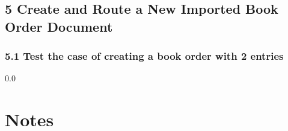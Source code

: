 \subsection*{5 Create and Route a New Imported Book Order Document}
\subsubsection*{5.1 Test the case of creating a book order with 2
  entries}

\newpage
  {\setlength{\baselineskip}%
           {0.0\baselineskip}
  \section*{Notes}
  \hrulefill \par}